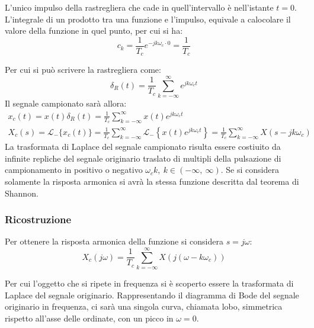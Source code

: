 \documentclass{article}
\numberwithin{equation}{subsection}
\begin{document}
L'unico impulso della rastregliera che cade in quell'intervallo è nell'istante $t=0$. L'integrale di un prodotto tra una funzione e l'impulso, equivale a calocolare il valore 
della funzione in quel punto, per cui si ha:
\begin{equation}
    c_k=\displaystyle\frac{1}{T_c}e^{-jk\omega_c \cdot0}=\frac{1}{T_c}
\end{equation}

Per cui si può scrivere la rastregliera come:
\begin{equation}
    \delta_R(t)=\displaystyle\frac{1}{T_c}\sum_{k=-\infty}^{\infty}e^{jk\omega_ct}
\end{equation}
Il segnale campionato sarà allora:
\begin{gather}
    x_c(t)=x(t)\delta_R(t)=\displaystyle\frac{1}{T_c}\sum_{k=-\infty}^{\infty}x(t)e^{jk\omega_ct}\\
    X_c(s)=\mathscr{L}_-\{x_c(t)\}=\displaystyle\frac{1}{T_c}\sum_{k=-\infty}^{\infty}\mathscr{L}_-\left\{x(t)e^{jk\omega_ct}\right\}=\frac{1}{T_c}\sum_{k=-\infty}^{\infty}X(s-jk\omega_c)
\end{gather}
La trasformata di Laplace del segnale campionato risulta essere costiuito da infinite repliche del segnale originario traslato di multipli della pulsazione di campionamento 
in positivo o negativo $\omega_ck,\:k\in(-\infty,\:\infty)$. Se si considera solamente la risposta armonica si avrà la stessa funzione descritta dal teorema di Shannon. 

\subsubsection{Ricostruzione}

Per ottenere la risposta armonica della funzione si considera $s=j\omega$:
\begin{equation}
    X_c(j\omega)=\displaystyle\frac{1}{T_c}\sum_{k=-\infty}^{\infty}X(j(\omega-k\omega_c))
\end{equation}

Per cui l'oggetto che si ripete in frequenza si è scoperto essere la trasformata di Laplace del 
segnale originario. Rappresentando il diagramma di Bode del segnale originario in frequenza, ci sarà una singola curva, chiamata lobo, simmetrica rispetto all'asse 
delle ordinate, con un picco in $\omega=0$.  
\begin{center}
\end{center}
\end{document}
